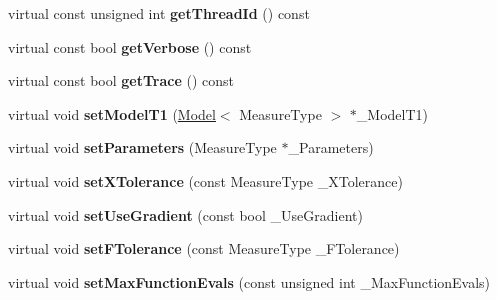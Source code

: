 \begin{DoxyCompactItemize}
\item 
\hypertarget{class_ox_1_1_fitter_a68e317f1c05ea2aa24f9d4803ee19215}{virtual const unsigned int {\bfseries get\-Thread\-Id} () const }\label{class_ox_1_1_fitter_a68e317f1c05ea2aa24f9d4803ee19215}

\item 
\hypertarget{class_ox_1_1_fitter_afeba16a2218db1f3fc646e2dde75f386}{virtual const bool {\bfseries get\-Verbose} () const }\label{class_ox_1_1_fitter_afeba16a2218db1f3fc646e2dde75f386}

\item 
\hypertarget{class_ox_1_1_fitter_a9c3401372be5c8698464deb05c0f5533}{virtual const bool {\bfseries get\-Trace} () const }\label{class_ox_1_1_fitter_a9c3401372be5c8698464deb05c0f5533}

\item 
\hypertarget{class_ox_1_1_fitter_acf3a35cf5c5b2c95c5af8565da444044}{virtual void {\bfseries set\-Model\-T1} (\hyperlink{class_ox_1_1_model}{Model}$<$ Measure\-Type $>$ $\ast$\-\_\-\-Model\-T1)}\label{class_ox_1_1_fitter_acf3a35cf5c5b2c95c5af8565da444044}

\item 
\hypertarget{class_ox_1_1_fitter_ab97f65c7d4d4db9bb0f5934aa0601b73}{virtual void {\bfseries set\-Parameters} (Measure\-Type $\ast$\-\_\-\-Parameters)}\label{class_ox_1_1_fitter_ab97f65c7d4d4db9bb0f5934aa0601b73}

\item 
\hypertarget{class_ox_1_1_fitter_ad2b680ee88b12dd51538a2da865b2589}{virtual void {\bfseries set\-X\-Tolerance} (const Measure\-Type \-\_\-\-X\-Tolerance)}\label{class_ox_1_1_fitter_ad2b680ee88b12dd51538a2da865b2589}

\item 
\hypertarget{class_ox_1_1_fitter_a2441247888adc90a26d779043f10c5e1}{virtual void {\bfseries set\-Use\-Gradient} (const bool \-\_\-\-Use\-Gradient)}\label{class_ox_1_1_fitter_a2441247888adc90a26d779043f10c5e1}

\item 
\hypertarget{class_ox_1_1_fitter_aca7109a663e737c46cb29483c2276f4a}{virtual void {\bfseries set\-F\-Tolerance} (const Measure\-Type \-\_\-\-F\-Tolerance)}\label{class_ox_1_1_fitter_aca7109a663e737c46cb29483c2276f4a}

\item 
\hypertarget{class_ox_1_1_fitter_a293d2876b8b053bd637c35c3f6f3f68e}{virtual void {\bfseries set\-Max\-Function\-Evals} (const unsigned int \-\_\-\-Max\-Function\-Evals)}\label{class_ox_1_1_fitter_a293d2876b8b053bd637c35c3f6f3f68e}


\end{DoxyCompactItemize}
